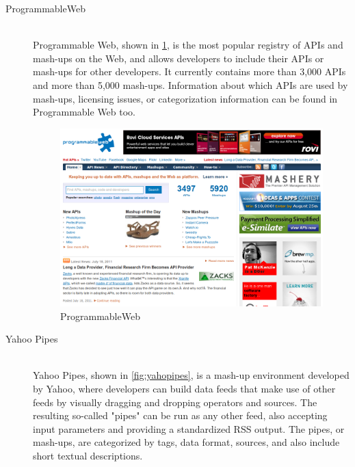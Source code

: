 \begin{description}
  \item[ProgrammableWeb] \hfill \\
  Programmable Web, shown in \ref{fig:programmableweb}, is the most popular registry of APIs and mash-ups on the Web, and allows developers to include their APIs or mash-ups for other developers. It currently contains more than 3,000 APIs and more than 5,000 mash-ups. Information about which APIs are used by mash-ups, licensing issues, or categorization information can be found in Programmable Web too.

\begin{figure}[ht!]
\centering
\includegraphics[width=400pt]{graphics/programmableweb.png}
\caption{ProgrammableWeb}
\label{fig:programmableweb}
\end{figure}
  
  \item[Yahoo Pipes] \hfill \\
  Yahoo Pipes, shown in \ref{fig:yahopipes}, is a mash-up environment developed by Yahoo, where developers can build data feeds that make use of other feeds by visually dragging and dropping operators and sources. The resulting so-called "pipes" can be run as any other feed, also accepting input parameters and providing a standardized RSS output. The pipes, or mash-ups, are categorized by tags, data format, sources, and also include short textual descriptions.


\end{description}
